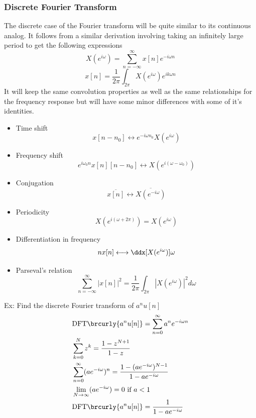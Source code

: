 \subsubsection{Discrete Fourier Transform}
The discrete case of the Fourier transform will be quite similar to its continuous analog. It follows from a similar derivation involving taking an infinitely large period to get the following expressions
$$\boxed{X(e^{i\omega})=\sum_{n=-\infty}^\infty x[n]e^{-i\omega n}}$$
$$\boxed{x[n]=\frac{1}{2\pi}\int_{2\pi}X(e^{i\omega})e^{ik\omega n}}$$
It will keep the same convolution properties as well as the same relationships for the frequency response but will have some minor differences with some of it's identities.\\
\begin{itemize}
    \item Time shift
    $$x[n-n_0]\longleftrightarrow e^{-i\omega n_0}X(e^{i\omega})$$
    \item Frequency shift
    $$e^{i\omega_0n}x[n][n-n_0]\longleftrightarrow X(e^{i(\omega-\omega_0)})$$
    \item Conjugation
    $$\overline{x[n]}\longleftrightarrow\overline{X(e^{-i\omega})}$$
    \item Periodicity
    $$X(e^{i(\omega+2\pi)})=X(e^{i\omega})$$
    \item Differentiation in frequency
    $$nx[n]\longleftrightarrow \ddx[X(e^{i\omega})]{\omega}$$
    \item Parseval's relation
    $$\sum_{n=-\infty}^\infty |x[n]|^2=\frac{1}{2\pi}\int_{2\pi}|X(e^{i\omega})|^2d\omega$$
\end{itemize}
Ex: Find the discrete Fourier transform of $a^nu[n]$
\begin{align*}
    &\mathrm{DFT}\brcurly{a^nu[n]}=\sum_{n=0}^\infty a^ne^{-i\omega n}\\
    &\sum_{k=0}^{N} z^{k} = \frac{1 - z^{N+1}}{1 - z}\\
    &\sum_{n=0}^\infty (ae^{-i\omega})^n=\frac{1-(ae^{-i\omega})^{N-1}}{1-ae^{-i\omega}}\\
    &\lim_{N\to\infty}(ae^{-i\omega})=0\text{ if }a<1\\
    &\mathrm{DFT}\brcurly{a^nu[n]}=\frac{1}{1-ae^{-i\omega}}
\end{align*}